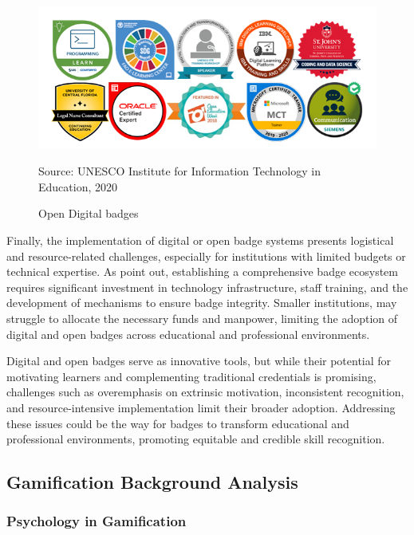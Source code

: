 \begin{figure}[htbp]
 \centering
 \includegraphics[width=14cm]{Media/Open_badges_examples.png}
 \caption{Open Digital badges}
 \label{fig:badgeExamples}
 {\raggedright \small{Source: UNESCO Institute for Information Technology in Education, 2020}\par}
\end{figure}
Finally, the implementation of digital or open badge systems presents logistical and resource-related challenges, especially for institutions with limited budgets or technical expertise. 
As \textcite{GibsonBadges} point out, establishing a comprehensive badge ecosystem requires significant investment in technology infrastructure, staff training, and the development of mechanisms to ensure badge integrity. Smaller institutions, may struggle to allocate the necessary funds and manpower, limiting the adoption of digital and open badges across educational and professional environments.

Digital and open badges serve as innovative tools, but while their potential for motivating learners and complementing traditional credentials is promising, challenges such as overemphasis on extrinsic motivation, inconsistent recognition, and resource-intensive implementation limit their broader adoption. 
Addressing these issues could be the way for badges to transform educational and professional environments, promoting equitable and credible skill recognition.\\
%
\subsection{Gamification Background Analysis}
%
\subsubsection{Psychology in Gamification}

